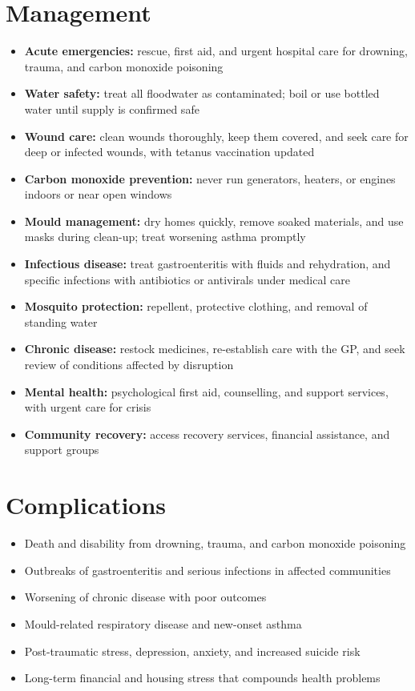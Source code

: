 \section*{Management}
\begin{itemize}
    \item \textbf{Acute emergencies:} rescue, first aid, and urgent hospital care for drowning, trauma, and carbon monoxide poisoning
    \item \textbf{Water safety:} treat all floodwater as contaminated; boil or use bottled water until supply is confirmed safe
    \item \textbf{Wound care:} clean wounds thoroughly, keep them covered, and seek care for deep or infected wounds, with tetanus vaccination updated
    \item \textbf{Carbon monoxide prevention:} never run generators, heaters, or engines indoors or near open windows
    \item \textbf{Mould management:} dry homes quickly, remove soaked materials, and use masks during clean-up; treat worsening asthma promptly
    \item \textbf{Infectious disease:} treat gastroenteritis with fluids and rehydration, and specific infections with antibiotics or antivirals under medical care
    \item \textbf{Mosquito protection:} repellent, protective clothing, and removal of standing water
    \item \textbf{Chronic disease:} restock medicines, re-establish care with the GP, and seek review of conditions affected by disruption
    \item \textbf{Mental health:} psychological first aid, counselling, and support services, with urgent care for crisis
    \item \textbf{Community recovery:} access recovery services, financial assistance, and support groups
\end{itemize}

\section*{Complications}
\begin{itemize}
    \item Death and disability from drowning, trauma, and carbon monoxide poisoning
    \item Outbreaks of gastroenteritis and serious infections in affected communities
    \item Worsening of chronic disease with poor outcomes
    \item Mould-related respiratory disease and new-onset asthma
    \item Post-traumatic stress, depression, anxiety, and increased suicide risk
    \item Long-term financial and housing stress that compounds health problems
\end{itemize}


